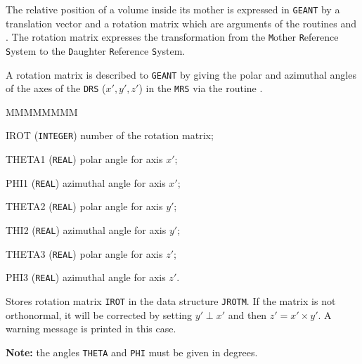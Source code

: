              

The relative position of a volume inside its mother is expressed in
{\tt GEANT} by a translation vector and a rotation matrix which are 
arguments of the routines  and . The rotation
matrix expresses the transformation from the {\tt M}other {\tt R}eference
{\tt S}ystem to the {\tt D}aughter {\tt R}eference {\tt S}ystem.

A rotation matrix is described to {\tt GEANT} by giving the polar and
azimuthal angles of the axes of the {\tt DRS} ($x', y', z'$) in the
{\tt MRS} via the routine .

\begin{DLtt}{MMMMMMMM}
\item[IROT] ({\tt INTEGER}) number of the rotation matrix;
\item[THETA1] ({\tt REAL}) polar angle for axis $x'$;
\item[PHI1] ({\tt REAL}) azimuthal angle for axis $x'$;
\item[THETA2] ({\tt REAL}) polar angle for axis $y'$;
\item[THI2] ({\tt REAL}) azimuthal angle for axis $y'$;
\item[THETA3] ({\tt REAL}) polar angle for axis $z'$;
\item[PHI3] ({\tt REAL}) azimuthal angle for axis $z'$.
\end{DLtt}
Stores rotation matrix {\tt IROT} in the data structure {\tt JROTM}. If the
matrix is not orthonormal, it will be corrected by setting $y' \perp x'$ and
then $z' = x' \times y'$. A warning message is printed in this case.

{\bf Note:}
the angles {\tt THETA} and {\tt PHI} must be given in degrees.
 
